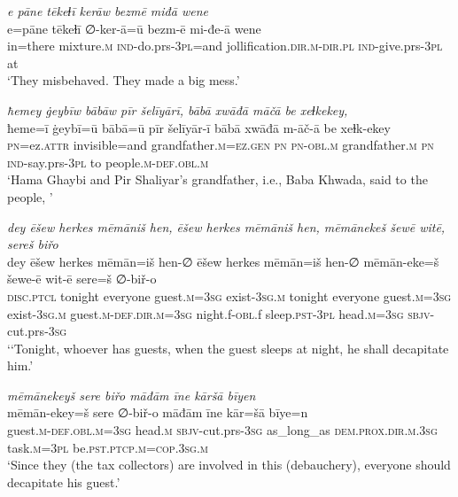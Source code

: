 \ea \label{BP.50}
\textit{e pāne tēkeɫī kerāw bezmē miđā wene} \\ 
\gll e=pāne tēkeɫī ∅-ker-ā=ū bezm-ē mi-đe-ā wene \\ 
 in=there mixture\textsc{.m} \textsc{ind-}do.prs\textsc{-3pl}=and jollification\textsc{.dir}\textsc{.m}\textsc{-dir}\textsc{.pl} \textsc{ind-}give.prs\textsc{-3pl} at \\ 
\glt `They misbehaved. They made a big mess.'
\z 
 
\ea \label{BP.51}
\textit{ħemey ġeybīw bābāw pīr šelīyārī, bābā xwāđā māčā be xeɫkekey,} \\ 
\gll ħeme=ī ġeybī=ū bābā=ū pīr šelīyār-ī bābā xwāđā m-āč-ā be xeɫk-ekey \\ 
 \textsc{pn}=ez.\textsc{attr} invisible=and grandfather\textsc{.m}\textsc{=ez.gen} \textsc{pn} \textsc{pn}\textsc{-obl}\textsc{.m} grandfather\textsc{.m} \textsc{pn} \textsc{ind-}say.prs\textsc{-3pl} to people\textsc{.m}\textsc{-def}\textsc{.obl}\textsc{.m} \\ 
\glt `Hama Ghaybi and Pir Shaliyar’s grandfather, i.e., Baba Khwada, said to the people, '
\z 
 
\ea \label{BP.52}
\textit{dey ēšew herkes mēmāniš hen, ēšew herkes mēmāniš hen, mēmānekeš šewē witē, sereš biřo} \\ 
\gll dey ēšew herkes mēmān=iš hen-∅ ēšew herkes mēmān=iš hen-∅ mēmān-eke=š šewe-ē wit-ē sere=š ∅-biř-o \\ 
 \textsc{disc.ptcl} tonight everyone guest\textsc{.m}\textsc{=3sg} exist\textsc{-3sg}\textsc{.m} tonight everyone guest\textsc{.m}\textsc{=3sg} exist\textsc{-3sg}\textsc{.m} guest\textsc{.m}\textsc{-def}\textsc{.dir}\textsc{.m}\textsc{=3sg} night.f\textsc{-obl}.f sleep\textsc{.pst}\textsc{-3pl} head\textsc{.m}\textsc{=3sg} \textsc{sbjv-}cut.prs\textsc{-3sg} \\ 
\glt `‘Tonight, whoever has guests, when the guest sleeps at night, he shall decapitate him.'
\z 
 
\ea \label{BP.53}
\textit{mēmānekeyš sere biřo māđām īne kāršā bīyen} \\ 
\gll mēmān-ekey=š sere ∅-biř-o māđām īne kār=šā bīye=n \\ 
 guest\textsc{.m}\textsc{-def}\textsc{.obl}\textsc{.m}\textsc{=3sg} head\textsc{.m} \textsc{sbjv-}cut.prs\textsc{-3sg} as\_long\_as \textsc{dem.prox}\textsc{.dir}\textsc{.m}\textsc{.3sg} task\textsc{.m}\textsc{=3pl} be\textsc{.pst}\textsc{.ptcp}\textsc{.m}\textsc{=cop}\textsc{.3sg}\textsc{.m} \\ 
\glt `Since they (the tax collectors) are involved in this (debauchery), everyone should decapitate his guest.'
\z 
 
